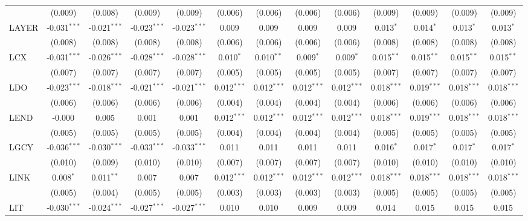 \begin{table}[!htbp]
\begin{tabular}{@{\extracolsep{5pt}}lcccccccccccc}
  & (0.009) & (0.008) & (0.009) & (0.009) & (0.006) & (0.006) & (0.006) & (0.006) & (0.009) & (0.009) & (0.009) & (0.009) \\
 LAYER & -0.031$^{***}$ & -0.021$^{***}$ & -0.023$^{***}$ & -0.023$^{***}$ & 0.009$^{}$ & 0.009$^{}$ & 0.009$^{}$ & 0.009$^{}$ & 0.013$^{*}$ & 0.014$^{*}$ & 0.013$^{*}$ & 0.013$^{*}$ \\
  & (0.008) & (0.008) & (0.008) & (0.008) & (0.006) & (0.006) & (0.006) & (0.006) & (0.008) & (0.008) & (0.008) & (0.008) \\
 LCX & -0.031$^{***}$ & -0.026$^{***}$ & -0.028$^{***}$ & -0.028$^{***}$ & 0.010$^{*}$ & 0.010$^{**}$ & 0.009$^{*}$ & 0.009$^{*}$ & 0.015$^{**}$ & 0.015$^{**}$ & 0.015$^{**}$ & 0.015$^{**}$ \\
  & (0.007) & (0.007) & (0.007) & (0.007) & (0.005) & (0.005) & (0.005) & (0.005) & (0.007) & (0.007) & (0.007) & (0.007) \\
 LDO & -0.023$^{***}$ & -0.018$^{***}$ & -0.021$^{***}$ & -0.021$^{***}$ & 0.012$^{***}$ & 0.012$^{***}$ & 0.012$^{***}$ & 0.012$^{***}$ & 0.018$^{***}$ & 0.019$^{***}$ & 0.018$^{***}$ & 0.018$^{***}$ \\
  & (0.006) & (0.006) & (0.006) & (0.006) & (0.004) & (0.004) & (0.004) & (0.004) & (0.006) & (0.006) & (0.006) & (0.006) \\
 LEND & -0.000$^{}$ & 0.005$^{}$ & 0.001$^{}$ & 0.001$^{}$ & 0.012$^{***}$ & 0.012$^{***}$ & 0.012$^{***}$ & 0.012$^{***}$ & 0.018$^{***}$ & 0.019$^{***}$ & 0.018$^{***}$ & 0.018$^{***}$ \\
  & (0.005) & (0.005) & (0.005) & (0.005) & (0.004) & (0.004) & (0.004) & (0.004) & (0.005) & (0.005) & (0.005) & (0.005) \\
 LGCY & -0.036$^{***}$ & -0.030$^{***}$ & -0.033$^{***}$ & -0.033$^{***}$ & 0.011$^{}$ & 0.011$^{}$ & 0.011$^{}$ & 0.011$^{}$ & 0.016$^{*}$ & 0.017$^{*}$ & 0.017$^{*}$ & 0.017$^{*}$ \\
  & (0.010) & (0.009) & (0.010) & (0.010) & (0.007) & (0.007) & (0.007) & (0.007) & (0.010) & (0.010) & (0.010) & (0.010) \\
 LINK & 0.008$^{*}$ & 0.011$^{**}$ & 0.007$^{}$ & 0.007$^{}$ & 0.012$^{***}$ & 0.012$^{***}$ & 0.012$^{***}$ & 0.012$^{***}$ & 0.018$^{***}$ & 0.018$^{***}$ & 0.018$^{***}$ & 0.018$^{***}$ \\
  & (0.005) & (0.004) & (0.005) & (0.005) & (0.003) & (0.003) & (0.003) & (0.003) & (0.005) & (0.005) & (0.005) & (0.005) \\
 LIT & -0.030$^{***}$ & -0.024$^{***}$ & -0.027$^{***}$ & -0.027$^{***}$ & 0.010$^{}$ & 0.010$^{}$ & 0.009$^{}$ & 0.009$^{}$ & 0.014$^{}$ & 0.015$^{}$ & 0.015$^{}$ & 0.015$^{}$ \\

\end{tabular}
\end{table}
